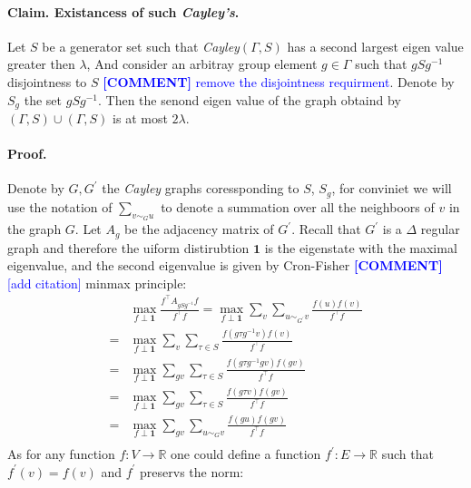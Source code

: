 \documentclass{article}
\newcommand{\commentt}[1]{\textcolor{blue}{ \textbf{[COMMENT]} #1}}
\newcommand{\ctt}[1]{\commentt{#1}}
\begin{document}
\begin{multicols*}{2}
  \paragraph{Claim. Existancess of such \emph{Cayley's}.} Let $S$ be a generator set such that \emph{Cayley}$\left( \Gamma , S \right)$ has a second largest eigen value greater then $\lambda$, And consider an arbitray group element $g \in \Gamma$ such that $gSg^{-1}$ disjointness to $S$ \ctt{ remove the disjointness requirment}. Denote by $S_{g}$ the set $gSg^{-1}$. Then the senond eigen value of the graph obtaind by $\left( \Gamma , S \right) \cup \left( \Gamma , S \right)$ is at most $2\lambda$. 
  \paragraph{Proof.} Denote by $G,G^{\prime}$ the \emph{Cayley} graphs coressponding to $S$, $S_{g}$, for conviniet we will use the notation of $\sum_{v\sim_{G} u}$ to denote a summation over all the neighboors of $v$ in the graph $G$. Let $A_{g}$ be the adjacency matrix of $G^{\prime}$. Recall that $G^{\prime}$ is a  $\Delta$ regular graph and therefore the uiform distirubtion $\mathbf{1}$ is the eigenstate with the maximal eigenvalue, and the second eigenvalue is given by Cron-Fisher\ctt{[add citation]}  minmax principle: 
  \begin{equation*}
    \begin{split}
      & \max_{f \perp \mathbf{1}} { \frac{f^{\top}A_{gSg^{-1}} f  }{ f^{\top}f}} = \max_{f \perp \mathbf{1}} { \sum_{v}  \sum_{u\sim_{G^{\prime}} v}\frac{f\left( u \right) f \left( v \right)  }{ f^{\top}f}} \\
      =  & \max_{f \perp \mathbf{1}} { \sum_{v}\sum_{\tau \in S} \frac{f\left( g\tau g^{-1} v \right) f \left( v \right)  }{ f^{\top}f}} \\ = & \max_{f \perp \mathbf{1}} { \sum_{gv} \sum_{\tau \in S}\frac{f\left( g\tau g^{-1} gv \right) f \left( gv \right)  }{ f^{\top}f}} \\  
      = & \max_{f \perp \mathbf{1}} { \sum_{gv}\sum_{\tau \in S}\frac{f\left( g \tau v \right) f \left( g v \right)  }{ f^{\top}f}} \\  = & \max_{f \perp \mathbf{1}} { \sum_{gv}\sum_{ u\sim_{G} v }\frac{f\left( gu \right) f \left( gv \right)  }{ f^{\top}f}} \\
         \end{split}
  \end{equation*}
  As for any function $f : V \rightarrow \mathbb{R} $ one could define a function $f^{\prime} : E \rightarrow \mathbb{R} $ such that $f^{\prime}\left( v \right) = f\left( v \right) $ and $f^{\prime}$ preservs the norm:    

\end{multicols*}
\end{document}
